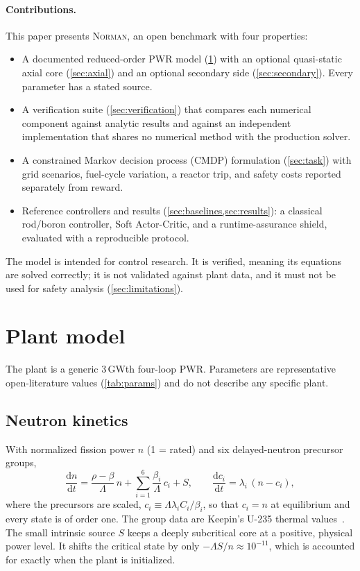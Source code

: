 \documentclass[11pt,a4paper]{article}
\newcommand{\dd}{\mathrm{d}}
\newcommand{\Norman}{\textsc{Norman}}
\begin{document}
\paragraph{Contributions.} This paper presents \Norman, an open benchmark with four
properties:
\begin{itemize}
  \item A documented reduced-order PWR model (\cref{sec:model}) with an optional
  quasi-static axial core (\cref{sec:axial}) and an optional secondary side
  (\cref{sec:secondary}). Every parameter has a stated source.
  \item A verification suite (\cref{sec:verification}) that compares each numerical
  component against analytic results and against an independent implementation that
  shares no numerical method with the production solver.
  \item A constrained Markov decision process (CMDP) formulation (\cref{sec:task})
  with grid scenarios, fuel-cycle variation, a reactor trip, and safety costs reported
  separately from reward.
  \item Reference controllers and results (\cref{sec:baselines,sec:results}): a
  classical rod/boron controller, Soft Actor-Critic, and a runtime-assurance shield,
  evaluated with a reproducible protocol.
\end{itemize}
The model is intended for control research. It is verified, meaning its equations are
solved correctly; it is not validated against plant data, and it must not be used for
safety analysis (\cref{sec:limitations}).

\section{Plant model}\label{sec:model}

The plant is a generic 3\,GWth four-loop PWR. Parameters are representative
open-literature values (\cref{tab:params}) and do not describe any specific plant.

\subsection{Neutron kinetics}

With normalized fission power $n$ (1 = rated) and six delayed-neutron precursor groups,
\begin{equation}
  \frac{\dd n}{\dd t} = \frac{\rho - \beta}{\Lambda}\, n + \sum_{i=1}^{6} \frac{\beta_i}{\Lambda}\, c_i + S,
  \qquad
  \frac{\dd c_i}{\dd t} = \lambda_i\,(n - c_i),
  \label{eq:pk}
\end{equation}
where the precursors are scaled, $c_i \equiv \Lambda\lambda_i C_i/\beta_i$, so that
$c_i = n$ at equilibrium and every state is of order one. The group data are Keepin's
U-235 thermal values~\cite{keepin1965}. The small intrinsic source $S$ keeps a deeply
subcritical core at a positive, physical power level. It shifts the critical state by
only $-\Lambda S/n \approx 10^{-11}$, which is accounted for exactly when the plant is
initialized.
\end{document}
